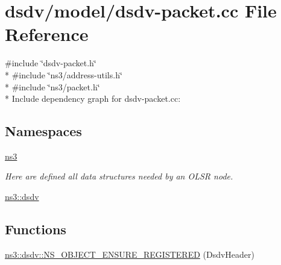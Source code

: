 \hypertarget{dsdv-packet_8cc}{}\section{dsdv/model/dsdv-\/packet.cc File Reference}
\label{dsdv-packet_8cc}
{\ttfamily \#include \char`\"{}dsdv-\/packet.\+h\char`\"{}}\\*
{\ttfamily \#include \char`\"{}ns3/address-\/utils.\+h\char`\"{}}\\*
{\ttfamily \#include \char`\"{}ns3/packet.\+h\char`\"{}}\\*
Include dependency graph for dsdv-\/packet.cc\+:
\subsection*{Namespaces}
\begin{DoxyCompactItemize}
\item 
 \hyperlink{namespacens3}{ns3}
\begin{DoxyCompactList}\small\item\em Here are defined all data structures needed by an O\+L\+SR node. \end{DoxyCompactList}\item 
 \hyperlink{namespacens3_1_1dsdv}{ns3\+::dsdv}
\end{DoxyCompactItemize}
\subsection*{Functions}
\begin{DoxyCompactItemize}
\item 
\hyperlink{namespacens3_1_1dsdv_afb44568c810ccf87d2f28891081c6893}{ns3\+::dsdv\+::\+N\+S\+\_\+\+O\+B\+J\+E\+C\+T\+\_\+\+E\+N\+S\+U\+R\+E\+\_\+\+R\+E\+G\+I\+S\+T\+E\+R\+ED} (Dsdv\+Header)
\end{DoxyCompactItemize}
